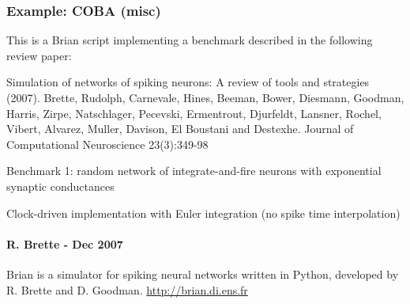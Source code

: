 \documentclass[letterpaper,10pt,english]{manual}
\begin{document}
\hypertarget{index-51}{}\subsubsection{Example: COBA (misc)}

This is a Brian script implementing a benchmark described
in the following review paper:

Simulation of networks of spiking neurons: A review of tools and strategies (2007).
Brette, Rudolph, Carnevale, Hines, Beeman, Bower, Diesmann, Goodman, Harris, Zirpe,
Natschlager, Pecevski, Ermentrout, Djurfeldt, Lansner, Rochel, Vibert, Alvarez, Muller,
Davison, El Boustani and Destexhe.
Journal of Computational Neuroscience 23(3):349-98

Benchmark 1: random network of integrate-and-fire neurons with exponential synaptic conductances

Clock-driven implementation with Euler integration
(no spike time interpolation)


\paragraph{R. Brette - Dec 2007}

Brian is a simulator for spiking neural networks written in Python, developed by
R. Brette and D. Goodman.
\href{http://brian.di.ens.fr}{http://brian.di.ens.fr}
\end{document}
